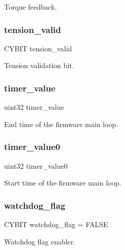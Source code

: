 Torque feedback. \mbox{\label{globals_8c_ac42fa606610c2600210d9b7b2c1d0882}} 
\subsubsection{tension\+\_\+valid}
{\footnotesize\ttfamily C\+Y\+B\+IT tension\+\_\+valid}

Tension validation bit. \mbox{\label{globals_8c_ad47cd0e4d0fcf5739a88e52e949a8084}} 
\subsubsection{timer\+\_\+value}
{\footnotesize\ttfamily uint32 timer\+\_\+value}

End time of the firmware main loop. \mbox{\label{globals_8c_a9bab7f1b1cf2ba38d5968eee42644c32}} 
\subsubsection{timer\+\_\+value0}
{\footnotesize\ttfamily uint32 timer\+\_\+value0}

Start time of the firmware main loop. \mbox{\label{globals_8c_a156a860c465529ff2f515725ab816a58}} 
\subsubsection{watchdog\+\_\+flag}
{\footnotesize\ttfamily C\+Y\+B\+IT watchdog\+\_\+flag = F\+A\+L\+SE}

Watchdog flag enabler. 